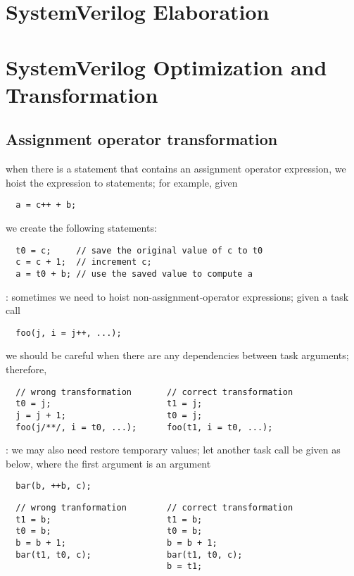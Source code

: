 \documentclass{note}
\begin{document}
\small


\tableofcontents

\section{SystemVerilog Elaboration}



\section{SystemVerilog Optimization and Transformation}
\subsection{Assignment operator transformation}
\bit
\w  when there is a statement that contains an assignment operator expression,
we hoist the expression to statements; for example, given
  \begin{verbatim}
  a = c++ + b;
  \end{verbatim}
we create the following statements:
  \begin{verbatim}
  t0 = c;     // save the original value of c to t0
  c = c + 1;  // increment c;
  a = t0 + b; // use the saved value to compute a
  \end{verbatim}
\w {}: sometimes we need to hoist
non-assignment-operator expressions; given a task call
  \begin{verbatim}
  foo(j, i = j++, ...);
  \end{verbatim}
we should be careful when there are any dependencies between task arguments;
therefore, 
  \begin{verbatim}
  // wrong transformation       // correct transformation
  t0 = j;                       t1 = j;
  j = j + 1;                    t0 = j;
  foo(j/**/, i = t0, ...);      foo(t1, i = t0, ...);
  \end{verbatim}

  \w {}: we may also need restore
  temporary values; let another task call be given as below, where the first
  argument is an  argument
  \begin{verbatim}
  bar(b, ++b, c);
  \end{verbatim}
  \begin{verbatim}
  // wrong tranformation        // correct transformation
  t1 = b;                       t1 = b;
  t0 = b;                       t0 = b;
  b = b + 1;                    b = b + 1;
  bar(t1, t0, c);               bar(t1, t0, c);
                                b = t1;
  \end{verbatim}
\eit 
\end{document}
